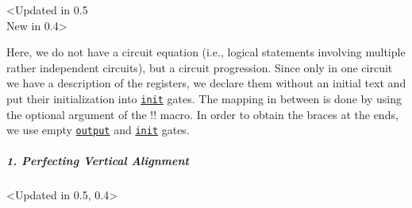 \documentclass{scrartcl}
\makeatletter
\newenvironment{codeexample*}{%
   \VerbatimEnvironment%
   \let\FVB@VerbatimOut\minted@FVB@VerbatimOut
   \let\FVE@VerbatimOut\minted@FVE@VerbatimOut
   \minted@configlang{tex}%
   \minted@fvset
   \begin{VerbatimOut}[codes={\catcode`\^^I=12},firstline,lastline]{\minted@jobname.pyg}%
}{
   \end{VerbatimOut}%
   \minted@langlinenoson%
   \begin{adjustbox}{center}
       \minted@jobname.pyg %
   \end{adjustbox}\nopagebreak
   \expandafter\minted@pygmentize\expandafter{\minted@lang}%
   \minted@langlinenosoff%
   \par%
}
\def\gate#1{\hyperref[gate:#1]{\texttt{#1}}}
\makeatother
\begin{document}
               \clearpage
               \begin{example}<Updated in 0.5\\New in 0.4>
                  \begin{codeexample*}
\begin{yquantgroup}
\end{yquantgroup}
                  \end{codeexample*}
                  Here, we do not have a circuit equation (i.e., logical statements involving multiple rather independent circuits), but a circuit progression.
                  Since only in one circuit we have a description of the registers, we declare them without an initial text and put their initialization into \gate{init} gates.
                  The mapping in between is done by using the optional argument of the \tex!\equals! macro.
                  In order to obtain the braces at the ends, we use empty \gate{output} and \gate{init} gates.
               \end{example}

               \clearpage
               \subparagraph{1. Perfecting Vertical Alignment}\leavevmode
                  \begin{example}<Updated in 0.5, 0.4>
                     \begin{codeexample*}
\begin{yquantgroup}
   \equals
\end{yquantgroup}
                     \end{codeexample*}
                  \end{example}
\end{document}
